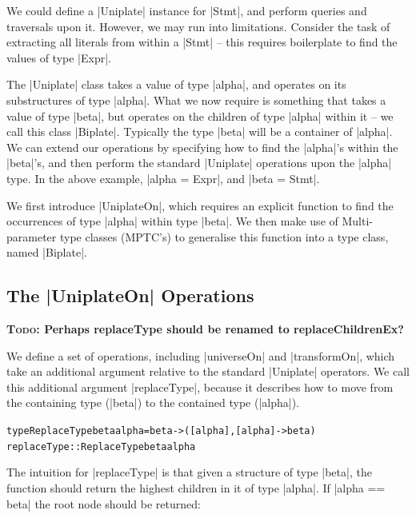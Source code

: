\documentclass[preprint]{sigplanconf}
\newcommand{\todo}[1]{\textbf{\textsc{Todo:} #1}}
\newenvironment{code}{\begin{alltt}\small}{\end{alltt}}
\newcommand{\ignore}{}
\begin{document}
We could define a |Uniplate| instance for |Stmt|, and perform queries and traversals upon it. However, we may run into limitations. Consider the task of extracting all literals from within a |Stmt| -- this requires boilerplate to find the values of type |Expr|.

The |Uniplate| class takes a value of type |alpha|, and operates on its substructures of type |alpha|. What we now require is something that takes a value of type |beta|, but operates on the children of type |alpha| within it -- we call this class |Biplate|. Typically the type |beta| will be a container of |alpha|. We can extend our operations by specifying how to find the |alpha|'s within the |beta|'s, and then perform the standard |Uniplate| operations upon the |alpha| type. In the above example, \ignore|alpha = Expr|, and \ignore|beta = Stmt|.

We first introduce |UniplateOn|, which requires an explicit function to find the occurrences of  type |alpha| within type |beta|. We then make use of Multi-parameter type classes (MPTC's) to generalise this function into a type class, named |Biplate|.

\subsection{The |UniplateOn| Operations}

\todo{Perhaps replaceType should be renamed to replaceChildrenEx?}

We define a set of operations, including |universeOn| and |transformOn|, which take an additional argument relative to the standard |Uniplate| operators. We call this additional argument |replaceType|, because it describes how to move from the containing type (|beta|) to the contained type (|alpha|).

\begin{code}
type ReplaceType beta alpha = beta -> ([alpha], [alpha] -> beta)
replaceType :: ReplaceType beta alpha
\end{code}

The intuition for |replaceType| is that given a structure of type |beta|, the function should return the highest children in it of type |alpha|. If \ignore|alpha == beta| the root node should be returned:
\end{document}
